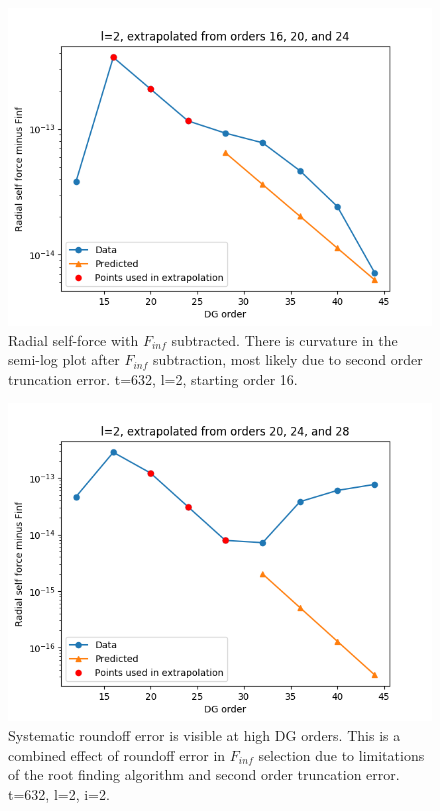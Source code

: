 \begin{figure}
  \includegraphics{extrapolate7t632l2i1}
  \caption{Radial self-force with $F_{inf}$ subtracted. There is curvature in the semi-log plot after $F_{inf}$ subtraction, most likely due to second order truncation error. t=632, l=2, starting order 16.}
  \label{truncation}
\end{figure}

\begin{figure}
  \includegraphics{extrapolate7t632l2i2}
  \caption{Systematic roundoff error is visible at high DG orders. This is a combined effect of roundoff error in $F_{inf}$ selection due to limitations of the root finding algorithm and second order truncation error. t=632, l=2, i=2.}
  \label{roundoff}
\end{figure}

